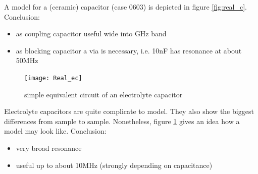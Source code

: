 A model for a (ceramic) capacitor (case 0603) is depicted in figure
\ref{fig:real_c}. Conclusion:
\begin{itemize}
\item as coupling capacitor useful wide into GHz band
\item as blocking capacitor a via is necessary, i.e. 10nF has resonance
      at about 50MHz
\end{itemize}

\addvspace{12pt}

\begin{figure}[ht]
\begin{center}
\texttt{[image: Real\_ec]}
\end{center}
\caption{simple equivalent circuit of an electrolyte capacitor}
\label{fig:real_ec}
\end{figure}
\FloatBarrier

Electrolyte capacitors are quite complicate to model. They also show the
biggest differences from sample to sample. Nonetheless, figure
\ref{fig:real_ec} gives an idea how a model may look like. Conclusion:
\begin{itemize}
\item very broad resonance
\item useful up to about 10MHz (strongly depending on capacitance)
\end{itemize}

